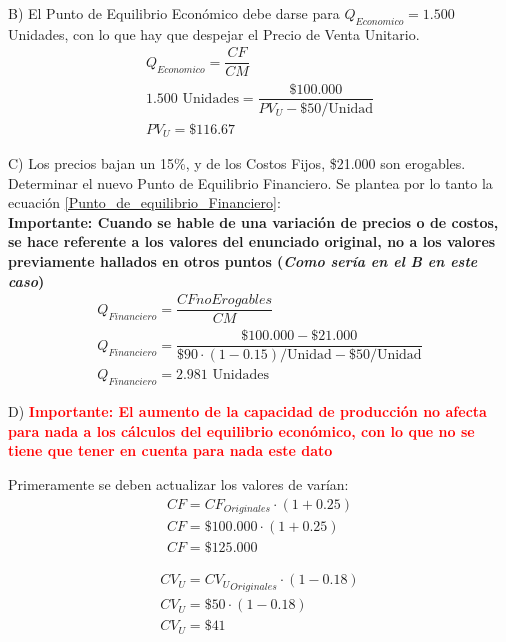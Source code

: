 \documentclass[12pt,a4paper]{article}
\begin{document}
        \hrulefill
        
        B) El Punto de Equilibrio Económico debe darse para $Q_{Economico}=1{.}500$ Unidades, con lo que hay que despejar el Precio de Venta Unitario.
        \begin{gather*}
            Q_{Economico} = \dfrac{ CF }{ CM } \\
            1{.}500\text{ Unidades} = \dfrac{ \$100{.}000 }{ {PV}_{U} - \$50 / \text{Unidad} } \\
            {PV}_{U} = \$116.67
        \end{gather*}
        
        \hrulefill
        
        C) Los precios bajan un 15\%, y de los Costos Fijos, \$21.000 son erogables. Determinar el nuevo Punto de Equilibrio Financiero. Se plantea por lo tanto la ecuación \ref{Punto_de_equilibrio_Financiero}:\\
        	\textbf{Importante: Cuando se hable de una variación de precios o de costos, se hace referente a los valores del enunciado original, no a los valores previamente hallados en otros puntos (\textsl{Como sería en el B en este caso})}
        \begin{gather*}
            Q_{Financiero} = \dfrac{ CF no Erogables }{ CM } \\
            Q_{Financiero} = \dfrac{ \$100{.}000 - \$21{.}000 }{ \$90 \cdot ( 1 - 0.15 ) / \text{Unidad} - \$50 / \text{Unidad} } \\
            Q_{Financiero} = 2{.}981\text{ Unidades}
        \end{gather*}
        
        \hrulefill
        
        D) \textbf{\textcolor{red}{Importante: El aumento de la capacidad de producción no afecta para nada a los cálculos del equilibrio económico, con lo que no se tiene que tener en cuenta para nada este dato}}\\
        \par{
        	Primeramente se deben actualizar los valores de varían:
            }
        \begin{gather*}
            CF = CF_{Originales} \cdot ( 1 + 0.25 ) \\
            CF = \$100{.}000 \cdot ( 1 + 0.25 ) \\
            CF = \$125{.}000
        \end{gather*}
        
        \begin{gather*}
            {CV}_{U} = {{CV}_{U}}_{Originales} \cdot ( 1 - 0.18 ) \\
            {CV}_{U} = \$50 \cdot ( 1 - 0.18 ) \\
            {CV}_{U} = \$41
        \end{gather*}
        
\end{document}
